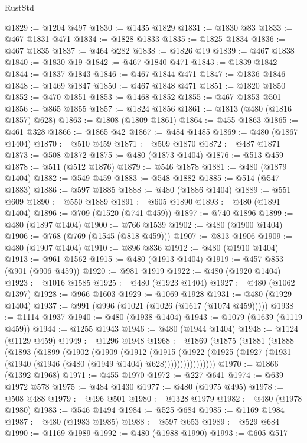 \begin{lexlean}{RustStd}
\begin{coremodule}
@1829 := @1204 @497
@1830 := @1435 @1829
@1831 := @1830 @83
@1833 := @467 @1831 @471
@1834 := @1828 @1833
@1835 := @1825 @1834
@1836 := @467 @1835
@1837 := @464 @282
@1838 := @1826 @19
@1839 := @467 @1838
@1840 := @1830 @19
@1842 := @467 @1840 @471
@1843 := @1839 @1842
@1844 := @1837 @1843
@1846 := @467 @1844 @471
@1847 := @1836 @1846
@1848 := @1469 @1847
@1850 := @467 @1848 @471
@1851 := @1820 @1850
@1852 := @470 @1851
@1853 := @1468 @1852
@1855 := @467 @1853 @501
@1856 := @865 @1855
@1857 := @1824 @1856
@1861 := @1813 (@480 (@1816 @1857) @628)
@1863 := @1808 (@1809 @1861)
@1864 := @455 @1863
@1865 := @461 @328
@1866 := @1865 @42
@1867 := @484 @1485
@1869 := @480 (@1867 @1404)
@1870 := @510 @459
@1871 := @509 @1870
@1872 := @487 @1871
@1873 := @508 @1872
@1875 := @480 (@1873 @1404)
@1876 := @513 @459
@1878 := @511 (@512 @1876)
@1879 := @546 @1878
@1881 := @480 (@1879 @1404)
@1882 := @549 @459
@1883 := @548 @1882
@1885 := @514 (@547 @1883)
@1886 := @597 @1885
@1888 := @480 (@1886 @1404)
@1889 := @551 @609
@1890 := @550 @1889
@1891 := @605 @1890
@1893 := @480 (@1891 @1404)
@1896 := @709 (@1520 (@741 @459))
@1897 := @740 @1896
@1899 := @480 (@1897 @1404)
@1900 := @766 @1539
@1902 := @480 (@1900 @1404)
@1906 := @768 (@769 (@1545 (@818 @459)))
@1907 := @813 @1906
@1909 := @480 (@1907 @1404)
@1910 := @896 @836
@1912 := @480 (@1910 @1404)
@1913 := @961 @1562
@1915 := @480 (@1913 @1404)
@1919 := @457 @853 (@901 (@906 @459))
@1920 := @981 @1919
@1922 := @480 (@1920 @1404)
@1923 := @1016 @1585
@1925 := @480 (@1923 @1404)
@1927 := @480 (@1062 @1397)
@1928 := @966 @1603
@1929 := @1069 @1928
@1931 := @480 (@1929 @1404)
@1937 := @991 (@996 (@1021 (@1026 (@1617 (@1074 @459)))))
@1938 := @1114 @1937
@1940 := @480 (@1938 @1404)
@1943 := @1079 (@1639 (@1119 @459))
@1944 := @1255 @1943
@1946 := @480 (@1944 @1404)
@1948 := @1124 (@1129 @459)
@1949 := @1296 @1948
@1968 := @1869
    (@1875
      (@1881
        (@1888
          (@1893
            (@1899
              (@1902
                (@1909
                  (@1912
                    (@1915
                      (@1922
                        (@1925 (@1927 (@1931 (@1940 (@1946 (@480 (@1949 @1404) @628))))))))))))))))
@1970 := @1866 (@1392 @1968)
@1971 := @455 @1970
@1972 := @227 @641
@1974 := @639 @1972 @578
@1975 := @484 @1430
@1977 := @480 (@1975 @495)
@1978 := @508 @488
@1979 := @496 @501
@1980 := @1328 @1979
@1982 := @480 (@1978 @1980)
@1983 := @546 @1494
@1984 := @525 @684
@1985 := @1169 @1984
@1987 := @480 (@1983 @1985)
@1988 := @597 @653
@1989 := @529 @684
@1990 := @1169 @1989
@1992 := @480 (@1988 @1990)
@1993 := @605 @517

\end{coremodule}
\end{lexlean}
